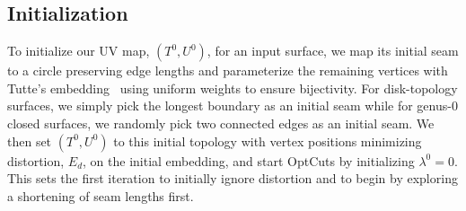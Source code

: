 \subsection{Initialization}
To initialize our UV map, $(T^0,U^0)$, for an input surface, we map its initial seam to a circle preserving edge lengths and parameterize the remaining vertices with Tutte's embedding~ using uniform weights to ensure bijectivity.
For disk-topology surfaces, we simply pick the longest boundary as an initial seam while for genus-0 closed surfaces, we randomly pick two connected edges as an initial seam. 
We then set $(T^0,U^0)$ to this initial topology with vertex positions minimizing distortion, $E_d$, on the initial embedding, and start OptCuts by initializing $\lambda^0 = 0$. This sets the first iteration to initially ignore distortion and to begin by exploring a shortening of seam lengths first.




